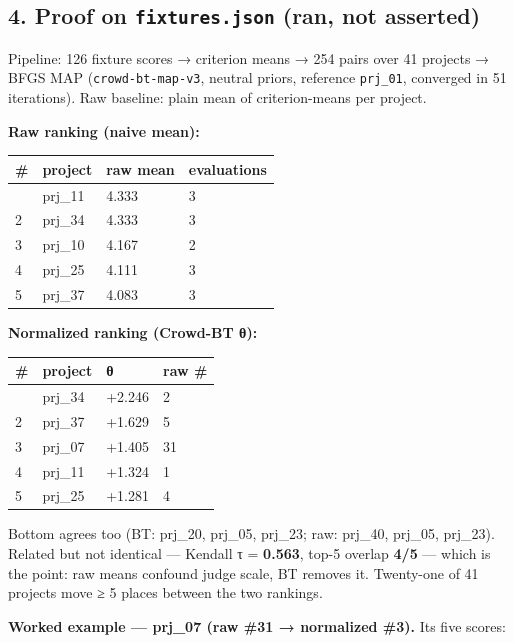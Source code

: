 \documentclass[
  11pt,
]{article}
\begin{document}
\hypertarget{proof-on-fixtures.json-ran-not-asserted}{%
\subsection{\texorpdfstring{4. Proof on \texttt{fixtures.json} (ran, not
asserted)}{4. Proof on fixtures.json (ran, not asserted)}}\label{proof-on-fixtures.json-ran-not-asserted}}

Pipeline: 126 fixture scores → criterion means → 254 pairs over 41
projects → BFGS MAP (\texttt{crowd-bt-map-v3}, neutral priors, reference
\texttt{prj\_01}, converged in 51 iterations). Raw baseline: plain mean
of criterion-means per project.

\textbf{Raw ranking (naive mean):}

\begin{longtable}[]{@{}llll@{}}
\toprule\noalign{}
\# & project & raw mean & evaluations \\
\midrule\noalign{}
\endhead
\bottomrule\noalign{}
\endlastfoot
1 & prj\_11 & 4.333 & 3 \\
2 & prj\_34 & 4.333 & 3 \\
3 & prj\_10 & 4.167 & 2 \\
4 & prj\_25 & 4.111 & 3 \\
5 & prj\_37 & 4.083 & 3 \\
\end{longtable}

\textbf{Normalized ranking (Crowd-BT θ):}

\begin{longtable}[]{@{}llll@{}}
\toprule\noalign{}
\# & project & θ & raw \# \\
\midrule\noalign{}
\endhead
\bottomrule\noalign{}
\endlastfoot
1 & prj\_34 & +2.246 & 2 \\
2 & prj\_37 & +1.629 & 5 \\
3 & prj\_07 & +1.405 & 31 \\
4 & prj\_11 & +1.324 & 1 \\
5 & prj\_25 & +1.281 & 4 \\
\end{longtable}

Bottom agrees too (BT: prj\_20, prj\_05, prj\_23; raw: prj\_40, prj\_05,
prj\_23). Related but not identical --- Kendall τ = \textbf{0.563},
top-5 overlap \textbf{4/5} --- which is the point: raw means confound
judge scale, BT removes it. Twenty-one of 41 projects move ≥ 5 places
between the two rankings.

\textbf{Worked example --- prj\_07 (raw \#31 → normalized \#3).} Its
five scores:
\end{document}
